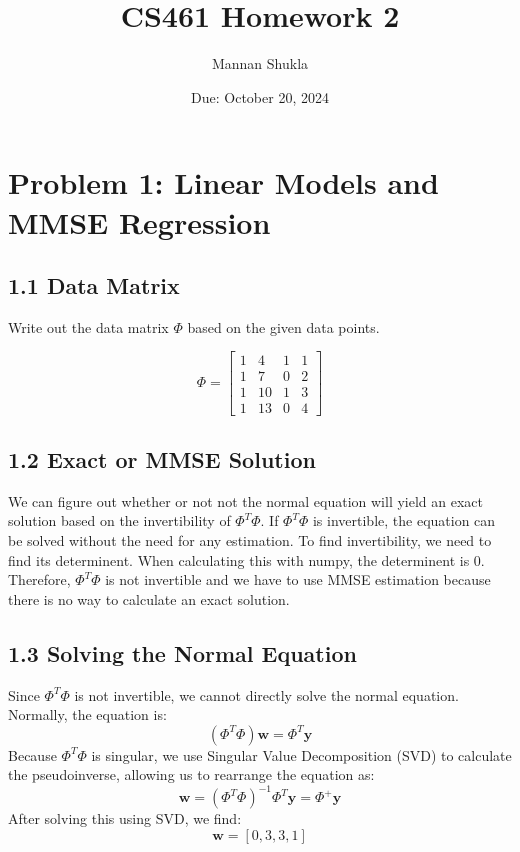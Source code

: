 \documentclass[12pt]{article}
\title{CS461 Homework 2}
\author{Mannan Shukla}
\date{Due: October 20, 2024}
\begin{document}
\maketitle

\section*{Problem 1: Linear Models and MMSE Regression}

\subsection*{1.1 Data Matrix}
Write out the data matrix \( \Phi \) based on the given data points.

\[
\Phi = \begin{bmatrix}
1 & 4 & 1 & 1 \\
1 & 7 & 0 & 2 \\
1 & 10 & 1 & 3 \\
1 & 13 & 0 & 4
\end{bmatrix}
\]

\subsection*{1.2 Exact or MMSE Solution}
We can figure out whether or not not the normal equation will yield an exact solution based on the invertibility of $\Phi^T \Phi$. If $\Phi^T \Phi$ is invertible, the equation can be solved without the need for any estimation. To find invertibility, we need to find its determinent. When calculating this with numpy, the determinent is 0. Therefore, $\Phi^T \Phi$ is not invertible and we have to use MMSE estimation because there is no way to calculate an exact solution.

\subsection*{1.3 Solving the Normal Equation}
Since $\Phi^T \Phi$ is not invertible, we cannot directly solve the normal equation. Normally, the equation is:
\[
(\Phi^T \Phi) \mathbf{w} = \Phi^T \mathbf{y}
\]
Because $\Phi^T \Phi$ is singular, we use Singular Value Decomposition (SVD) to calculate the pseudoinverse, allowing us to rearrange the equation as:
\[
\mathbf{w} = (\Phi^T \Phi)^{-1} \Phi^T \mathbf{y} = \Phi^+ \mathbf{y}
\]
After solving this using SVD, we find:
\[
\mathbf{w} = [0, 3, 3, 1]
\]
\end{document}
